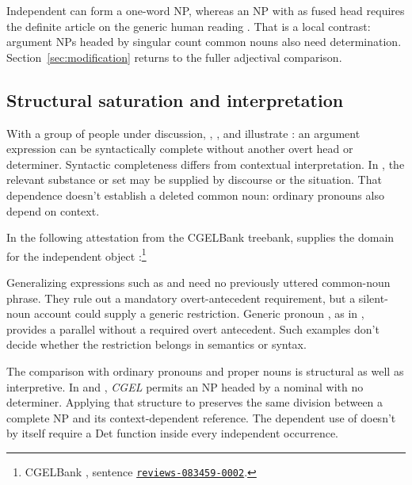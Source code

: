 \documentclass[12pt]{article}
\begin{document}
Independent  can form a one-word NP, whereas an NP with  as fused head requires the definite article  on the generic human reading \citep[417--418]{huddleston2002}. That is a local contrast: argument NPs headed by singular count common nouns also need determination. Section~\ref{sec:modification} returns to the fuller adjectival comparison.

\subsection{Structural saturation and interpretation}

With a group of people under discussion, , , and  illustrate : an argument expression can be syntactically complete without another overt head or determiner. Syntactic completeness differs from contextual interpretation. In , the relevant substance or set may be supplied by discourse or the situation. That dependence doesn't establish a deleted common noun: ordinary pronouns also depend on context.

In the following attestation from the CGELBank treebank,  supplies the domain for the independent object :\footnote{CGELBank \citep{reynolds2023unified}, sentence \href{https://github.com/nert-nlp/cgel/blob/d0a2c2d8c522b23d5aa879fc9cb94948f4285b2c/datasets/ewt.cgel\#L651-L654}{\nolinkurl{reviews-083459-0002}}.}
\ea\label{ex:attested-both}
\z

Generalizing expressions such as  and  need no previously uttered common-noun phrase. They rule out a mandatory overt-antecedent requirement, but a silent-noun account could supply a generic restriction. Generic pronoun , as in , provides a parallel without a required overt antecedent. Such examples don't decide whether the restriction belongs in semantics or syntax.

The comparison with ordinary pronouns and proper nouns is structural as well as interpretive. In  and , \textit{CGEL} permits an NP headed by a nominal with no determiner. Applying that structure to  preserves the same division between a complete NP and its context-dependent reference. The dependent use of  doesn't by itself require a Det function inside every independent occurrence.
\end{document}
